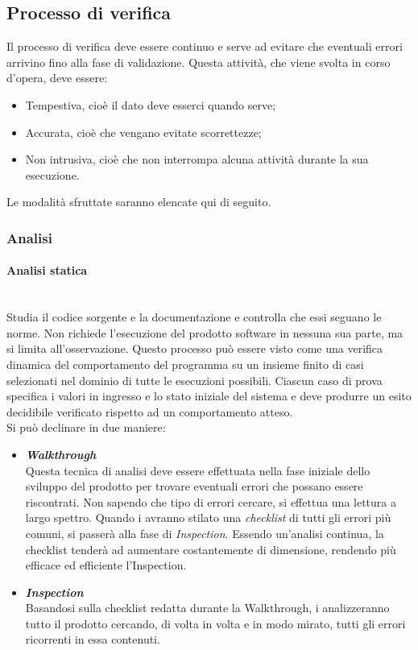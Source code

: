 \subsection{Processo di verifica}
Il processo di verifica deve essere continuo e serve ad evitare che eventuali errori arrivino fino alla fase di validazione.
Questa attività, che viene svolta in corso d'opera, deve essere:
\begin{itemize}
	\item Tempestiva, cioè il dato deve esserci quando serve;
	\item Accurata, cioè che vengano evitate scorrettezze;
	\item Non intrusiva, cioè che non interrompa alcuna attività durante la sua esecuzione.
\end{itemize}
Le modalità sfruttate saranno elencate qui di seguito.
	\subsubsection{Analisi}
	\paragraph{Analisi statica}
	~\\Studia il codice sorgente e la documentazione e controlla che essi seguano le norme. Non richiede l'esecuzione del prodotto software in nessuna sua parte, ma si limita all'osservazione. Questo processo può essere visto come una verifica dinamica del comportamento del programma su un insieme finito di casi selezionati nel dominio di tutte le esecuzioni possibili. Ciascun caso di prova specifica i valori in ingresso e lo stato iniziale del sistema e deve produrre un esito decidibile verificato rispetto ad un comportamento atteso. 
	\\Si può declinare in due maniere:
	\begin{itemize}
		\item \emph{\textbf{Walkthrough}}
		~\\Questa tecnica di analisi deve essere effettuata nella fase iniziale dello sviluppo del prodotto per trovare eventuali errori che possano essere riscontrati. Non sapendo che tipo di errori cercare, si effettua una lettura a largo spettro. Quando i \vers{} avranno stilato una \emph{checklist} di tutti gli errori più comuni, si passerà alla fase di \emph{Inspection}. Essendo un'analisi continua, la checklist tenderà ad aumentare costantemente di dimensione, rendendo più efficace ed efficiente l'Inspection.
		\item \emph{\textbf{Inspection}}
		~\\Basandosi sulla checklist redatta durante la Walkthrough, i \vers{} analizzeranno tutto il prodotto cercando, di volta in volta e in modo mirato, tutti gli errori ricorrenti in essa contenuti.
	\end{itemize}
